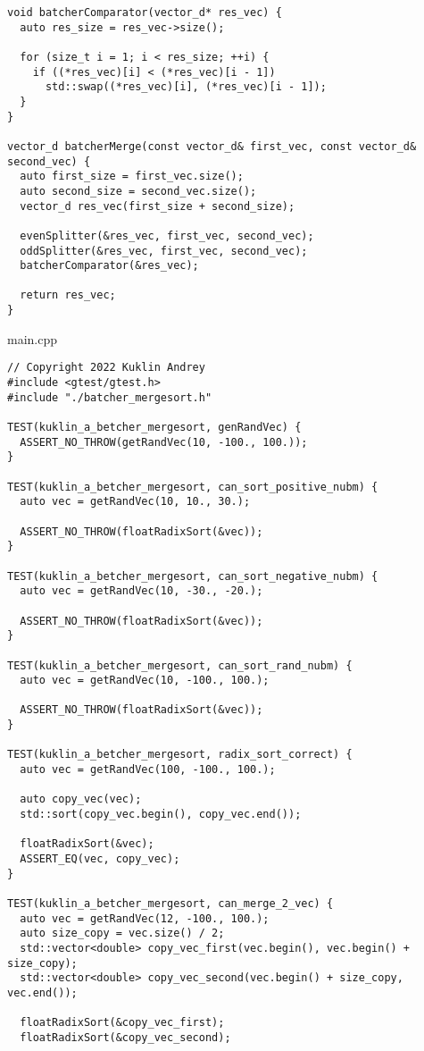 \documentclass{report}
\begin{document}
\begin{lstlisting}
void batcherComparator(vector_d* res_vec) {
  auto res_size = res_vec->size();

  for (size_t i = 1; i < res_size; ++i) {
    if ((*res_vec)[i] < (*res_vec)[i - 1])
      std::swap((*res_vec)[i], (*res_vec)[i - 1]);
  }
}

vector_d batcherMerge(const vector_d& first_vec, const vector_d& second_vec) {
  auto first_size = first_vec.size();
  auto second_size = second_vec.size();
  vector_d res_vec(first_size + second_size);

  evenSplitter(&res_vec, first_vec, second_vec);
  oddSplitter(&res_vec, first_vec, second_vec);
  batcherComparator(&res_vec);

  return res_vec;
}
\end{lstlisting}
\par main.cpp
\begin{lstlisting}
// Copyright 2022 Kuklin Andrey
#include <gtest/gtest.h>
#include "./batcher_mergesort.h"

TEST(kuklin_a_betcher_mergesort, genRandVec) {
  ASSERT_NO_THROW(getRandVec(10, -100., 100.));
}

TEST(kuklin_a_betcher_mergesort, can_sort_positive_nubm) {
  auto vec = getRandVec(10, 10., 30.);

  ASSERT_NO_THROW(floatRadixSort(&vec));
}

TEST(kuklin_a_betcher_mergesort, can_sort_negative_nubm) {
  auto vec = getRandVec(10, -30., -20.);

  ASSERT_NO_THROW(floatRadixSort(&vec));
}

TEST(kuklin_a_betcher_mergesort, can_sort_rand_nubm) {
  auto vec = getRandVec(10, -100., 100.);

  ASSERT_NO_THROW(floatRadixSort(&vec));
}

TEST(kuklin_a_betcher_mergesort, radix_sort_correct) {
  auto vec = getRandVec(100, -100., 100.);

  auto copy_vec(vec);
  std::sort(copy_vec.begin(), copy_vec.end());

  floatRadixSort(&vec);
  ASSERT_EQ(vec, copy_vec);
}

TEST(kuklin_a_betcher_mergesort, can_merge_2_vec) {
  auto vec = getRandVec(12, -100., 100.);
  auto size_copy = vec.size() / 2;
  std::vector<double> copy_vec_first(vec.begin(), vec.begin() + size_copy);
  std::vector<double> copy_vec_second(vec.begin() + size_copy, vec.end());

  floatRadixSort(&copy_vec_first);
  floatRadixSort(&copy_vec_second);


\end{lstlisting}
\end{document}
